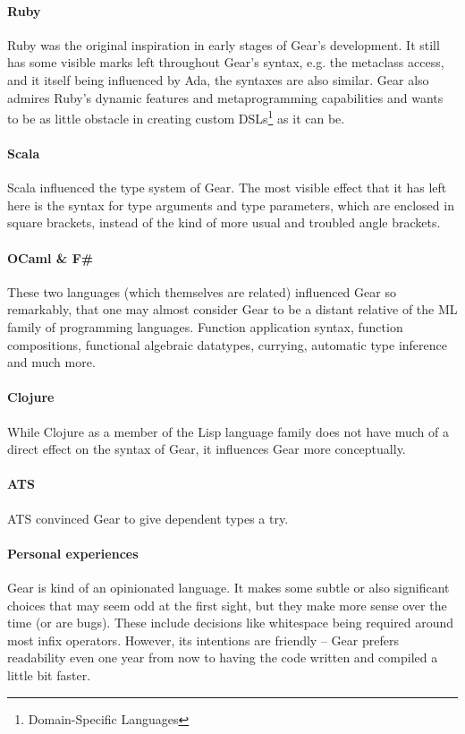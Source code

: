 \paragraph{Ruby}
Ruby was the original inspiration in early stages of Gear's development. It still has some visible marks left throughout Gear's syntax, e.g. the metaclass access, and it itself being influenced by Ada, the syntaxes are also similar. Gear also admires Ruby's dynamic features and metaprogramming capabilities and wants to be as little obstacle in creating custom DSLs\footnote{Domain-Specific Languages} as it can be. 

\paragraph{Scala}
Scala influenced the type system of Gear. The most visible effect that it has left here is the syntax for type arguments and type parameters, which are enclosed in square brackets, instead of the kind of more usual and troubled angle brackets. 

\paragraph{OCaml \& F\#}
These two languages (which themselves are related) influenced Gear so remarkably, that one may almost consider Gear to be a distant relative of the ML family of programming languages. Function application syntax, function compositions, functional algebraic datatypes, currying, automatic type inference and much more. 

\paragraph{Clojure}
While Clojure as a member of the Lisp language family does not have much of a direct effect on the syntax of Gear, it influences Gear more conceptually. 

\paragraph{ATS}
ATS convinced Gear to give dependent types a try. 

\paragraph{Personal experiences}
Gear is kind of an opinionated language. It makes some subtle or also significant choices that may seem odd at the first sight, but they make more sense over the time (or are bugs). These include decisions like whitespace being required around most infix operators. However, its intentions are friendly -- Gear prefers readability even one year from now to having the code written and compiled a little bit faster. 





